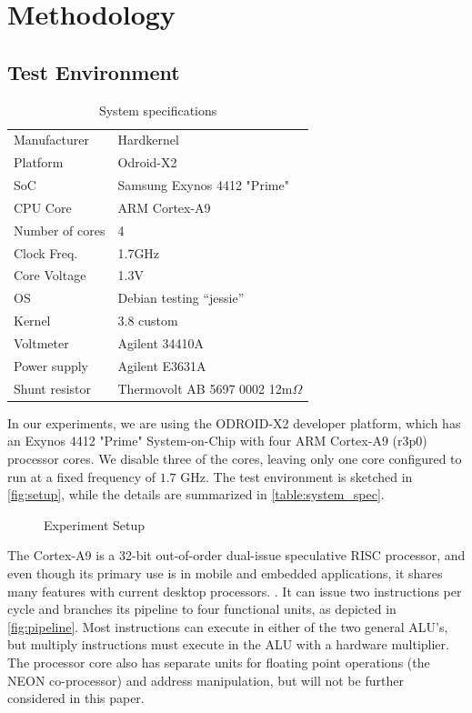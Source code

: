 \section{Methodology}

\subsection{Test Environment}
\begin{table}
    \begin{tabular}{l|l}
        \hline
        \hline
    Manufacturer    & Hardkernel\\
    Platform        & Odroid-X2\\
    SoC             & Samsung Exynos 4412 "Prime"\\
    CPU Core        & ARM Cortex-A9\\
    Number of cores & 4\\
    Clock Freq.     & 1.7GHz\\
    Core Voltage    & 1.3V\\
    OS              & Debian testing ``jessie''\\
    Kernel          & 3.8 custom\\
        \hline
        \hline
    Voltmeter       & Agilent 34410A\\
    Power supply    & Agilent E3631A\\
    Shunt resistor  & Thermovolt AB 5697 0002 12m$\Omega$\\
        \hline
        \hline
    \end{tabular}
    \caption{System specifications}
    \label{table:system_spec}
\end{table}

In our experiments, we are using the ODROID-X2 \cite{odroid-x2} developer
platform, which has an Exynos 4412 "Prime" System-on-Chip with four ARM
Cortex-A9 (r3p0) processor cores. We disable three of the cores, leaving only
one core configured to run at a fixed frequency of $1.7$ GHz. The test
environment is sketched in \autoref{fig:setup}, while the details are summarized in
\autoref{table:system_spec}.

\begin{figure}
    
    \caption{Experiment Setup}
    \label{fig:setup}
\end{figure}

The Cortex-A9 is a 32-bit out-of-order dual-issue speculative RISC processor,
and even though its primary use is in mobile and embedded applications, it
shares many features with current desktop processors. \cite{patterson,hennessy}.
It can issue two instructions per cycle and branches its pipeline to four
functional units, as depicted in \autoref{fig:pipeline}. Most instructions can
execute in either of the two general ALU's, but multiply instructions must
execute in the ALU with a hardware multiplier. The processor core also has
separate units for floating point operations (the NEON co-processor) and address
manipulation, but will not be further considered in this paper.

